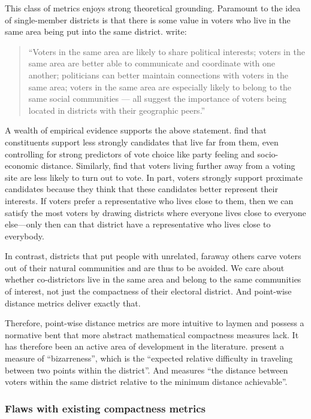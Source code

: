 \documentclass[]{article}
\begin{document}
This class of metrics enjoys strong theoretical grounding. Paramount to
the idea of single-member districts is that there is some value in
voters who live in the same area being put into the same district.
\cite{er2019} write:

\begin{quote}
``Voters in the same area are likely to share political interests;
voters in the same area are better able to communicate and coordinate
with one another; politicians can better maintain connections with
voters in the same area; voters in the same area are especially likely
to belong to the same social communities --- all suggest the importance
of voters being located in districts with their geographic peers.''
\end{quote}

A wealth of empirical evidence supports the above statement.
\cite{arzheimer2012} find that constituents support less strongly
candidates that live far from them, even controlling for strong
predictors of vote choice like party feeling and socio-economic
distance. Similarly, \cite{dyck2005} find that voters living further
away from a voting site are less likely to turn out to vote. In part,
voters strongly support proximate candidates because they think that
these candidates better represent their interests. If voters prefer a
representative who lives close to them, then we can satisfy the most
voters by drawing districts where everyone lives close to everyone
else---only then can that district have a representative who lives close
to everybody.

In contrast, districts that put people with unrelated, faraway others
carve voters out of their natural communities and are thus to be
avoided. We care about whether co-districtors live in the same area and
belong to the same communities of interest, not just the compactness of
their electoral district. And point-wise distance metrics deliver
exactly that.

Therefore, point-wise distance metrics are more intuitive to laymen and
possess a normative bent that more abstract mathematical compactness
measures lack. It has therefore been an active area of development in
the literature. \cite{cm2010} present a measure of ``bizarreness'',
which is the ``expected relative difficulty in traveling between two
points within the district''. And \cite{fh2011} measures ``the distance
between voters within the same district relative to the minimum distance
achievable''.

\hypertarget{flaws-with-existing-compactness-metrics}{%
\subsubsection{Flaws with existing compactness
metrics}\label{flaws-with-existing-compactness-metrics}}
\end{document}
